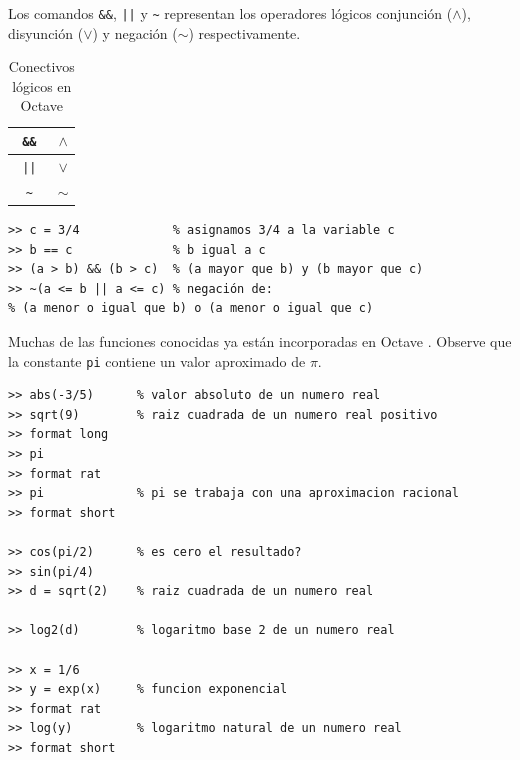 \documentclass[letter,11pt]{article}
\newcommand\0{\mathbf{0}}
\newcommand{\octave}{{\sc Octave }}
\begin{document}
Los comandos \Verb+&&+, \Verb+||+ y \Verb+~+
	representan los operadores l\'ogicos conjunci\'on ($\wedge$),
	disyunci\'on ($\vee$) y negaci\'on ($\sim$) respectivamente.	

	
	\begin{table}[ht]
\begin{center}
		\begin{tabular}{|c|c|}\hline
			\Verb+ && + & $\wedge$\\\hline
			\Verb+ || + & $\vee$\\\hline
			\Verb+ ~ + & $\sim$\\\hline
		\end{tabular}
\end{center}
\caption{Conectivos l\'ogicos en \octave}\label{table:logic}
\end{table}

\newpage
\begin{lstlisting}
>> c = 3/4             % asignamos 3/4 a la variable c
>> b == c              % b igual a c
>> (a > b) && (b > c)  % (a mayor que b) y (b mayor que c)
>> ~(a <= b || a <= c) % negación de:
% (a menor o igual que b) o (a menor o igual que c)
\end{lstlisting}

\medskip

Muchas de las funciones conocidas ya est\'an incorporadas en \octave.
Observe que la cons\-tan\-te \Verb+pi+ contiene un valor aproximado de $\pi$.

\medskip

\begin{lstlisting}
>> abs(-3/5)      % valor absoluto de un numero real
>> sqrt(9)        % raiz cuadrada de un numero real positivo
>> format long
>> pi
>> format rat
>> pi             % pi se trabaja con una aproximacion racional
>> format short

>> cos(pi/2)      % es cero el resultado?
>> sin(pi/4)
>> d = sqrt(2)    % raiz cuadrada de un numero real

>> log2(d)        % logaritmo base 2 de un numero real	

>> x = 1/6
>> y = exp(x)     % funcion exponencial		
>> format rat
>> log(y)         % logaritmo natural de un numero real
>> format short
\end{lstlisting}

\medskip
\end{document}
